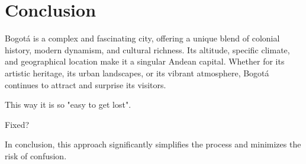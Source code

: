 \documentclass{article}
\begin{document}
\section{Conclusion}
Bogotá is a complex and fascinating city, offering a unique blend of colonial history, modern dynamism, and cultural richness. Its altitude, specific climate, and geographical location make it a singular Andean capital. Whether for its artistic heritage, its urban landscapes, or its vibrant atmosphere, Bogotá continues to attract and surprise its visitors.

This way it is so "easy to get lost".

Fixed?

In conclusion, this approach significantly simplifies the process and minimizes the risk of confusion.
\end{document}
